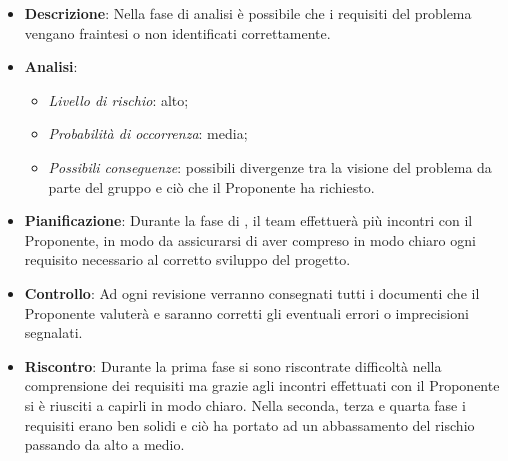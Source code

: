 			\begin{itemize}
				\item \textbf{Descrizione}: Nella fase di analisi è possibile che i requisiti del problema vengano fraintesi o non identificati correttamente. 
				\item \textbf{Analisi}:
				\begin{itemize}
					\item \textit{Livello di rischio}: alto;
					\item \textit{Probabilità di occorrenza}: media;
					\item \textit{Possibili conseguenze}: possibili divergenze tra la visione del problema da parte del gruppo e ciò che il Proponente ha richiesto.
				\end{itemize}
				\item \textbf{Pianificazione}: Durante la fase di , il team effettuerà più incontri con il Proponente, in modo da assicurarsi di aver compreso in modo chiaro ogni requisito necessario al corretto sviluppo del progetto.
				\item \textbf{Controllo}: Ad ogni revisione verranno consegnati tutti i documenti che il Proponente valuterà e saranno corretti gli eventuali errori o imprecisioni segnalati.
				\item \textbf{Riscontro}: Durante la prima fase si sono riscontrate difficoltà nella comprensione dei requisiti ma grazie agli incontri effettuati con il Proponente si è riusciti a capirli in modo chiaro. Nella seconda, terza e quarta fase i requisiti erano ben solidi e ciò ha portato ad un abbassamento del rischio passando da alto a medio.
			\end{itemize}
